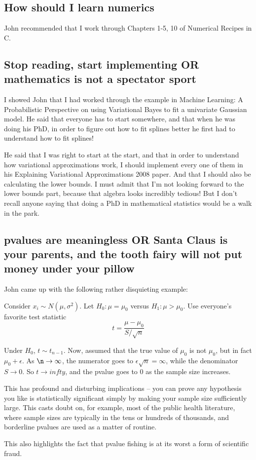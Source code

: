 \documentclass{amsart}
\begin{document}
\subsection{How should I learn numerics}
John recommended that I work through Chapters 1-5, 10 of Numerical Recipes
in C.

\subsection{Stop reading, start implementing OR mathematics is not a spectator sport}
I showed John that I had worked through the example in Machine Learning: A
Probabilistic Perspective on using Variational Bayes to fit a univariate
Gaussian model. He said that everyone has to start somewhere, and that when
he was doing his PhD, in order to figure out how to fit splines better he first
had to understand how to fit splines!

He said that I was right to start at the start, and that in order to understand
how variational approximations work, I should implement every one of them in
his Explaining Variational Approximations 2008 paper. And that I should also
be calculating the lower bounds. I must admit that I'm not looking forward to
the lower bounds part, because that algebra looks incredibly tedious! But I don't
recall anyone saying that doing a PhD in mathematical statistics would be a
walk in the park.

\subsection{pvalues are meaningless OR Santa Claus is your parents, and the tooth fairy will not put money under your pillow}
John came up with the following rather disquieting example:

Consider $x_i \sim N(\mu, \sigma^2)$. Let $H_0: \mu = \mu_0$ versus
$H_1: \mu > \mu_0$. Use everyone's favorite test statistic
\[
t = \frac{\mu - \mu_0}{S/\sqrt{n}}
\]

Under $H_0$, $t \sim t_{n-1}$. Now, assumed that the true value of $\mu_0$ is not $\mu_0$, but in fact
$\mu_0 + \epsilon$. As $\n \to \infty$, the numerator goes to $\epsilon \sqrt{n} = \infty$, while the
denominator $S \to 0$. So $t \to infty$, and the pvalue goes to $0$ as the sample size increases.

This has profound and disturbing implications -- you can prove any hypothesis you like is
statistically significant simply by making your sample size sufficiently large. This casts
doubt on, for example, most of the public health literature, where sample sizes are typically
in the tens or hundreds of thousands, and borderline pvalues are used as a matter of routine.

This also highlights the fact that pvalue fishing is at its worst a form of scientific fraud.
\end{document}
